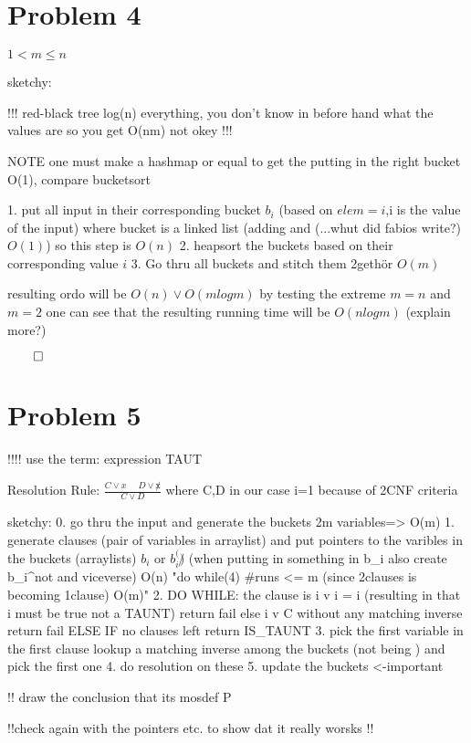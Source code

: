 \documentclass[a4paper,twoside=false,abstract=false,numbers=noenddot,
titlepage=false,headings=small,parskip=half,version=last]{scrartcl}
\begin{document}
\section{Problem 4}


$1 < m \leq n$

sketchy:

!!! red-black tree log(n) everything, you don't know in before hand what the values are so you get O(nm) not okey  !!!

NOTE one must make a hashmap or equal to get the putting in the right bucket O(1), compare bucketsort

1. put all input in their corresponding bucket $b_i$ (based on $elem=i$,i is the value of the input) where bucket is a linked list (adding and (...whut did fabios write?) $O(1)$) so this step is $O(n)$
2. heapsort the buckets based on their corresponding value $i$
3. Go thru all buckets and stitch them 2gethör $O(m)$

resulting ordo will be $ O(n) \vee O(mlogm)$ by testing the extreme $m=n$ and $m=2$ one can see that the resulting running time will be $O(nlogm)$ (explain more?)

$\qed$
\section{Problem 5}

!!!! use the term: expression \notin TAUT

Resolution Rule: $\frac{C \vee x \ \ \ \ \ \ D \vee \not x}{C \vee D}$ where C,D \in {} in our case i=1 because of 2CNF criteria 

sketchy:
0. go thru the input and generate the buckets 2m variables=> O(m)
1. generate clauses (pair of variables in arraylist) and put pointers to the varibles in the buckets (arraylists) $b_i$ or $b_i^(\not)$ (when putting in something in b_i also create b_i^not and viceverse)         O(n)
   "do while(4) #runs <= m  (since 2clauses is becoming 1clause) O(m)" 
2. DO WHILE: the clause is i v i = i (resulting in that i must be true not a TAUNT) return fail else i v C without any matching inverse return fail ELSE IF no clauses left return IS_TAUNT
    3. pick the first variable in the first clause lookup a matching inverse among the buckets (not being ) and pick the first one
    4. do resolution on these
    5. update the buckets <-important

!! draw the conclusion that its mosdef \in P

!!check again with the pointers etc. to show dat it really worsks !!
\end{document}
